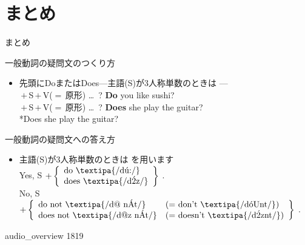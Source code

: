 \documentclass[aspectratio=169,dvipsnames]{beamer}
\newcommand{\myaudio}[1]{\href{#1}{\faVolumeUp}}
\begin{document}
\section{まとめ}
\begin{frame}[plain]{まとめ}
 

\begin{block}{一般動詞の疑問文のつくり方}\small
\begin{itemize}[square]
 \item   先頭にDoまたはDoes\hspace{10pt}---主語(S)が3人称単数のときは\,\,---\\
	 \,$+$\,S\,$+$\,V{\scriptsize ($=$\,原形)} \ldots\,\,\,? \hfill{}\textbf{Do} you like sushi?\\
	 \,$+$\,S\,$+$\,V{\scriptsize ($=$\,原形)} \ldots\,\,\,? \hfill{}\textbf{Does} she play the guitar?\\
\hfill{}*Does she play the guitar?
\end{itemize}
     \end{block}

\begin{block}{一般動詞の疑問文への答え方}\small
\begin{itemize}[square]
 \item 主語(S)が3人称単数のときは\,\,を用います\\
Yes, S $+ \left\{\begin{array}{l}
		  \text{do \textipa{/d\'u:/}}\\
		\text{does \textipa{/d\'2z/}}\end{array}\right\}$\,\,.
\\
No, S $+ \left\{\begin{array}{ll}
		  \text{do not \textipa{/d@ n\'At/}}&\text{($=$ don't \textipa{/d\'oUnt/})}\\
		\text{does not \textipa{/d@z n\'At/}}&\text{($=$ doesn't \textipa{/d\'2znt/})}\end{array}\right\}$\,\,.
\end{itemize}
      \end{block}

\vspace{-8pt}
\hfill{\tiny audio\_overview 1819}\,{\scriptsize \myaudio{./audio/overview/011_answer_do_audio_overview.mp4}}

\end{frame}
\end{document}
